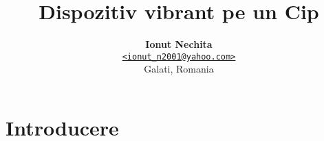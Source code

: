 \documentclass[a4paper, twocolumn]{article}
\title{\vspace{-1.5em}\textbf{Dispozitiv vibrant pe un Cip}}
\author{{\textbf{Ionut Nechita}} \\
        {\href{mailto:ionut_n2001@yahoo.com}
        {\texttt{<ionut\_n2001@yahoo.com>}}} \\
        {Galati, Romania}}
\begin{document}
    \maketitle

    \begin{abstract}  \end{abstract} %
    \section{Introducere} \label{sec:introduction} 

    \nocite{*} %
    
    
    \appendix

    
\end{document}
